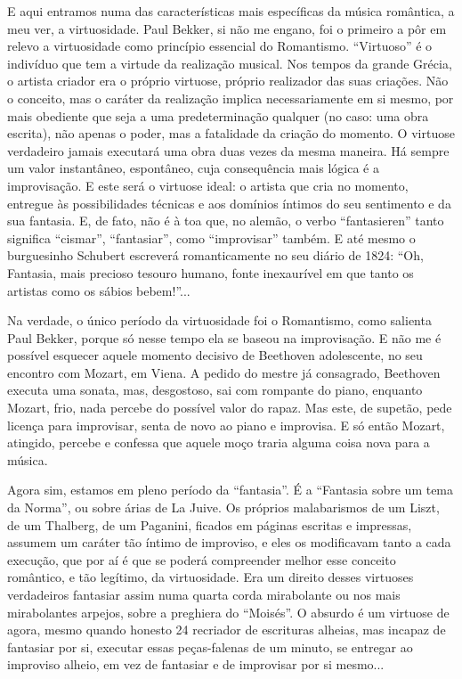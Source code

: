 E aqui entramos numa das características mais específicas da música
romântica, a meu ver, a virtuosidade. Paul Bekker, si não me engano, foi
o primeiro a pôr em relevo a virtuosidade como princípio essencial do
Romantismo. ``Virtuoso'' é o indivíduo que tem a virtude da realização
musical. Nos tempos da grande Grécia, o artista criador era o próprio
virtuose, próprio realizador das suas criações. Não o conceito, mas o
caráter da realização implica necessariamente em si mesmo, por mais
obediente que seja a uma predeterminação qualquer (no caso: uma obra
escrita), não apenas o poder, mas a fatalidade da criação do momento. O
virtuose verdadeiro jamais executará uma obra duas vezes da mesma
maneira. Há sempre um valor instantâneo, espontâneo, cuja consequência
mais lógica é a improvisação. E este será o virtuose ideal: o artista
que cria no momento, entregue às possibilidades técnicas e aos domínios
íntimos do seu sentimento e da sua fantasia. E, de fato, não é à toa
que, no alemão, o verbo ``fantasieren'' tanto significa ``cismar'',
``fantasiar'', como ``improvisar'' também. E até mesmo o burguesinho
Schubert escreverá romanticamente no seu diário de 1824: ``Oh, Fantasia,
mais precioso tesouro humano, fonte inexaurível em que tanto os artistas
como os sábios bebem!''...

Na verdade, o único período da virtuosidade foi o Romantismo, como
salienta Paul Bekker, porque só nesse tempo ela se baseou na
improvisação. E não me é possível esquecer aquele momento decisivo de
Beethoven adolescente, no seu encontro com Mozart, em Viena. A pedido do
mestre já consagrado, Beethoven executa uma sonata, mas, desgostoso, sai
com rompante do piano, enquanto Mozart, frio, nada percebe do possível
valor do rapaz. Mas este, de supetão, pede licença para improvisar,
senta de novo ao piano e improvisa. E só então Mozart, atingido, percebe
e confessa que aquele moço traria alguma coisa nova para a música.

Agora sim, estamos em pleno período da ``fantasia''. É a ``Fantasia
sobre um tema da Norma'', ou sobre árias de La Juive. Os próprios
malabarismos de um Liszt, de um Thalberg, de um Paganini, ficados em
páginas escritas e impressas, assumem um caráter tão íntimo de
improviso, e eles os modificavam tanto a cada execução, que por aí é que
se poderá compreender melhor esse conceito romântico, e tão legítimo, da
virtuosidade. Era um direito desses virtuoses verdadeiros fantasiar
assim numa quarta corda mirabolante ou nos mais mirabolantes arpejos,
sobre a preghiera do ``Moisés''. O absurdo é um virtuose de agora, mesmo
quando honesto 24 recriador de escrituras alheias, mas incapaz de
fantasiar por si, executar essas peças-falenas de um minuto, se entregar
ao improviso alheio, em vez de fantasiar e de improvisar por si mesmo...

